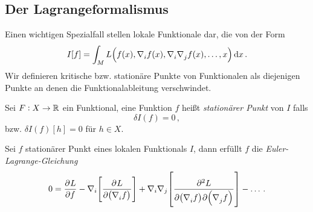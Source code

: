 \subsection{Der Lagrangeformalismus}
Einen wichtigen Spezialfall stellen lokale Funktionale dar, die von der Form
\begin{equation}
I[f]=\int_M L\left(f(x),\tensor{\nabla}{_i}
f(x),\tensor{\nabla}{_i}\tensor{\nabla}{_j} f(x),\dots,x\right)\dif x\,.
\end{equation}
Wir definieren kritische bzw. stationäre Punkte von Funktionalen als diejenigen
Punkte an denen die Funktionalableitung verschwindet.
\begin{definition}
Sei $F:X\to\mathbb{R}$ ein Funktional, eine Funktion $f$ heißt \emph{stationärer
Punkt} von $I$ falls
\begin{equation}
\delta {I}(f)=0\,,
\end{equation}
bzw. $\delta {I}(f)[h]=0$ für $h\in X$.
\end{definition}
\begin{lemma}
Sei $f$ stationärer Punkt eines lokalen Funktionals $I$,
dann erfüllt $f$ die \emph{Euler-Lagrange-Gleichung}
\begin{equation}
0=\dpd{L}{f}-\nabla_i\left[\dpd{L}{\left(\tensor{\nabla}{_i}f\right)}\right]
+\nabla_i\nabla_j\left[\dmd{L}{2}{\left(\tensor{\nabla}{_i}f\right)}{}{\left(\tensor{\nabla}{_j}f\right)}{}
\right]-\dots\,.
\end{equation}
\end{lemma}
